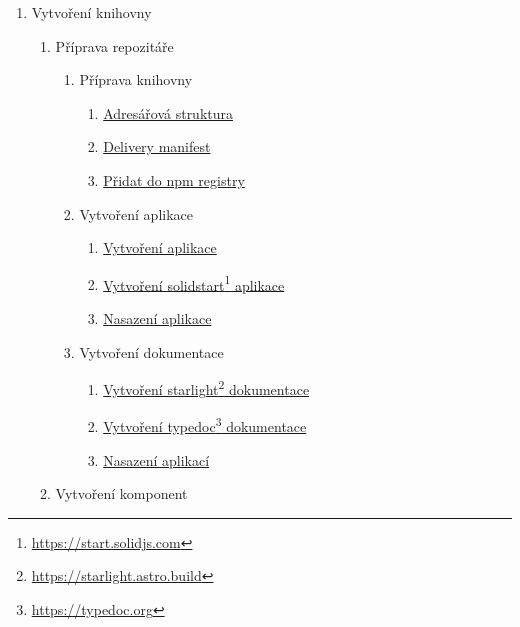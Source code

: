 \begin{enumerate}[label=\arabic*.]
      \item Vytvoření knihovny
            \begin{enumerate}[label*=\arabic*.]
                  \item Příprava repozitáře
                        \begin{enumerate}[label*=\arabic*.]
                              \item Příprava knihovny
                                    \begin{enumerate}[label*=\arabic*.]
                                          \item \ul{Adresářová struktura}
                                          \item \ul{Delivery manifest}
                                          \item \ul{Přidat do npm registry}
                                    \end{enumerate}
                              \item Vytvoření aplikace
                                    \begin{enumerate}[label*=\arabic*.]
                                          \item \ul{Vytvoření aplikace}
                                          \item \ul{Vytvoření solidstart\footnote{\url{https://start.solidjs.com}} aplikace}
                                          \item \ul{Nasazení aplikace}
                                    \end{enumerate}
                              \item Vytvoření dokumentace
                                    \begin{enumerate}[label*=\arabic*.]
                                          \item \ul{Vytvoření starlight\footnote{\url{https://starlight.astro.build}} dokumentace}
                                          \item \ul{Vytvoření typedoc\footnote{\url{https://typedoc.org}} dokumentace}
                                          \item \ul{Nasazení aplikací}
                                    \end{enumerate}
                        \end{enumerate}
                  \item Vytvoření komponent

\end{enumerate}
\end{enumerate}
